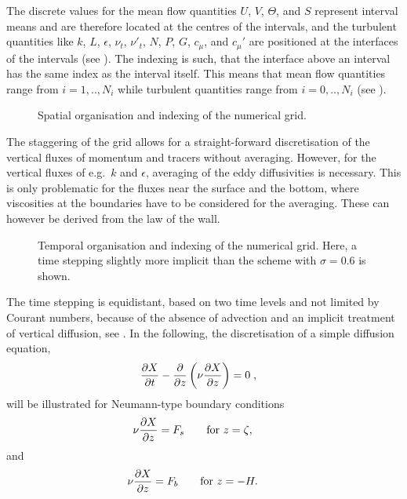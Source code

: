 The discrete values for the mean flow quantities $U$, $V$, $\Theta$,
and $S$ represent interval means and are therefore located at the
centres of the intervals, and the turbulent quantities like $k$, $L$,
$\epsilon$, $\nu_t$, $\nu'_t$, $N$, $P$, $G$, $c_{\mu}$, and
$c_{\mu}'$ are positioned at the interfaces of the intervals (see
).  The indexing is such, that the interface
above an interval has the same index as the interval itself.  This
means that mean flow quantities range from $i=1,..,N_i$ while
turbulent quantities range from $i=0,..,N_i$ (see ).
\begin{figure}[!h]	
  \begin{center}	
    \caption{Spatial organisation and indexing of the numerical grid.\label{FigGrid}}
  \end{center}
\end{figure}
The staggering of the grid allows for a
straight-forward discretisation of the vertical fluxes of momentum
and tracers without averaging.  However, for the vertical fluxes of
e.g.\ $k$ and $\epsilon$, averaging of the eddy diffusivities is
necessary. This is only problematic for the fluxes near the surface
and the bottom, where viscosities at the boundaries have to be
considered for the averaging. These can however be derived from the
law of the wall.
\begin{figure}
  \begin{center}
   \caption{Temporal organisation and indexing of the numerical grid.
            Here, a time stepping slightly more implicit than the 
             \cite{CrankNicolson47} 
            scheme with $\sigma=0.6$ is shown.\label{FigGridTime}}
\end{center}
\end{figure}

The time stepping is equidistant, based on two time levels and not
limited by Courant numbers, because of the absence of advection and an
implicit treatment of vertical diffusion, see .  In
the following, the discretisation of a simple diffusion equation,
\begin{equation}
  \label{simpleDiffusion}
  \dfrac{\partial {X}}{\partial {t}} - \dfrac{\partial {}}{\partial {z}} \left( \nu \dfrac{\partial {X}}{\partial {z}} \right) = 0
  \; , \quad
\end{equation}
will be illustrated for Neumann-type
boundary conditions
\begin{equation}
  \nu \dfrac{\partial {X}}{\partial {z}} = F_s
  \qquad \mbox{for } z=\zeta,\qquad
\end{equation}
and
\begin{equation}
  \nu \dfrac{\partial {X}}{\partial {z}} = F_b
  \qquad \mbox{for } z=-H.\qquad
\end{equation}

